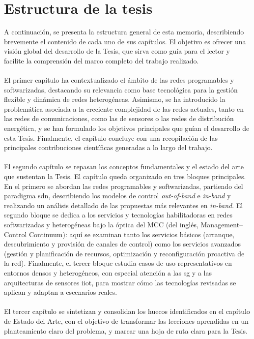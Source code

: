 \section{Estructura de la tesis}

A continuación, se presenta la estructura general de esta memoria, describiendo brevemente el contenido de cada uno de sus capítulos. El objetivo es ofrecer una visión global del desarrollo de la Tesis, que sirva como guía para el lector y facilite la comprensión del marco completo del trabajo realizado.\\
\\
El primer capítulo ha contextualizado el ámbito de las redes programables y softwarizadas, destacando su relevancia como base tecnológica para la gestión flexible y dinámica de redes heterogéneas. Asimismo, se ha introducido la problemática asociada a la creciente complejidad de las redes actuales, tanto en las redes de comunicaciones, como las de sensores o las redes de distribución energética, y se han formulado los objetivos principales que guían el desarrollo de esta Tesis. Finalmente, el capítulo concluye con una recopilación de las principales contribuciones científicas generadas a lo largo del trabajo.\\
\\
El segundo capítulo se repasan los conceptos fundamentales y el estado del arte que sustentan la Tesis. El capítulo queda organizado en tres bloques principales. En el primero se abordan las redes programables y softwarizadas, partiendo del paradigma \gls{sdn}, describiendo los modelos de control \textit{out-of-band} e \textit{in-band} y realizando un análisis detallado de las propuestas más relevantes en \textit{in-band}. El segundo bloque se dedica a los servicios y tecnologías habilitadoras en redes softwarizadas y heterogéneas bajo la óptica del MCC (del inglés, Management–Control Continuum): aquí se examinan tanto los servicios básicos (arranque, descubrimiento y provisión de canales de control) como los servicios avanzados (gestión y planificación de recursos, optimización y reconfiguración proactiva de la red). Finalmente, el tercer bloque estudia casos de uso representativos en entornos densos y heterogéneos, con especial atención a las \gls{sg} y a las arquitecturas de sensores \gls{iiot}, para mostrar cómo las tecnologías revisadas se aplican y adaptan a escenarios reales.\\
\\
El tercer capítulo se sintetizan y consolidan los huecos identificados en el capítulo de Estado del Arte, con el objetivo de transformar las lecciones aprendidas en un planteamiento claro del problema, y marcar una hoja de ruta clara para la Tesis.\\
